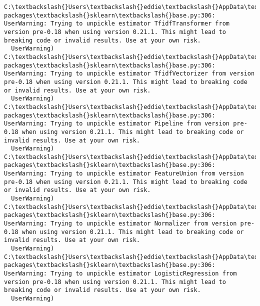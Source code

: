 \documentclass[11pt]{article}
\begin{document}
    \begin{Verbatim}[commandchars=\\\{\}]
C:\textbackslash{}Users\textbackslash{}eddie\textbackslash{}AppData\textbackslash{}Roaming\textbackslash{}Python\textbackslash{}Python36\textbackslash{}site-packages\textbackslash{}sklearn\textbackslash{}base.py:306: UserWarning: Trying to unpickle estimator TfidfTransformer from version pre-0.18 when using version 0.21.1. This might lead to breaking code or invalid results. Use at your own risk.
  UserWarning)
C:\textbackslash{}Users\textbackslash{}eddie\textbackslash{}AppData\textbackslash{}Roaming\textbackslash{}Python\textbackslash{}Python36\textbackslash{}site-packages\textbackslash{}sklearn\textbackslash{}base.py:306: UserWarning: Trying to unpickle estimator TfidfVectorizer from version pre-0.18 when using version 0.21.1. This might lead to breaking code or invalid results. Use at your own risk.
  UserWarning)
C:\textbackslash{}Users\textbackslash{}eddie\textbackslash{}AppData\textbackslash{}Roaming\textbackslash{}Python\textbackslash{}Python36\textbackslash{}site-packages\textbackslash{}sklearn\textbackslash{}base.py:306: UserWarning: Trying to unpickle estimator Pipeline from version pre-0.18 when using version 0.21.1. This might lead to breaking code or invalid results. Use at your own risk.
  UserWarning)
C:\textbackslash{}Users\textbackslash{}eddie\textbackslash{}AppData\textbackslash{}Roaming\textbackslash{}Python\textbackslash{}Python36\textbackslash{}site-packages\textbackslash{}sklearn\textbackslash{}base.py:306: UserWarning: Trying to unpickle estimator FeatureUnion from version pre-0.18 when using version 0.21.1. This might lead to breaking code or invalid results. Use at your own risk.
  UserWarning)
C:\textbackslash{}Users\textbackslash{}eddie\textbackslash{}AppData\textbackslash{}Roaming\textbackslash{}Python\textbackslash{}Python36\textbackslash{}site-packages\textbackslash{}sklearn\textbackslash{}base.py:306: UserWarning: Trying to unpickle estimator Normalizer from version pre-0.18 when using version 0.21.1. This might lead to breaking code or invalid results. Use at your own risk.
  UserWarning)
C:\textbackslash{}Users\textbackslash{}eddie\textbackslash{}AppData\textbackslash{}Roaming\textbackslash{}Python\textbackslash{}Python36\textbackslash{}site-packages\textbackslash{}sklearn\textbackslash{}base.py:306: UserWarning: Trying to unpickle estimator LogisticRegression from version pre-0.18 when using version 0.21.1. This might lead to breaking code or invalid results. Use at your own risk.
  UserWarning)

    \end{Verbatim}
\end{document}
